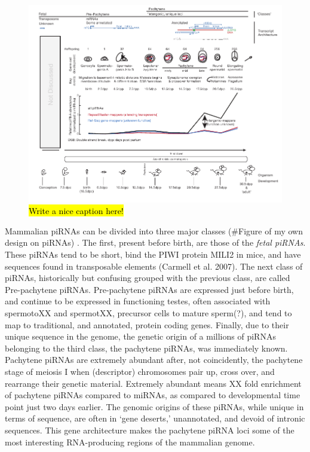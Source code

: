 \begin{figure}[htbp]
	\centering 
	\includegraphics{Figures/MammalianPiRNAClassesOverTime.pdf}
	\caption[Different Classes of mammalian piRNAs]
	{
		\hl{Write a nice caption here!}
	}
	\label{fig:Mammalian piRNA classes}
\end{figure}

Mammalian piRNAs can be divided into three major classes (\#Figure of my own design on piRNAs) \citep{Kuramochi-Miyagawa2008}. The first, present before birth, are those of the \textit{fetal piRNAs}. These piRNAs tend to be short, bind the PIWI protein MILI2 in mice, and have sequences found in transposable elements (Carmell et al. 2007). The next class of piRNAs, historically but confusing grouped with the previous class, are called Pre-pachytene piRNAs. Pre-pachytene piRNAs are expressed just before birth, and continue to be expressed in functioning testes, often associated with spermotoXX and spermotXX, precursor cells to mature sperm(?), and tend to map to traditional, and annotated, protein coding genes. Finally, due to their unique sequence in the genome, the genetic origin of a millions of piRNAs belonging to the third class, the pachytene piRNAs, was immediately known. Pachytene piRNAs are extremely abundant after, not coincidently, the pachytene stage of meiosis I when (descriptor) chromosomes pair up, cross over, and rearrange their genetic material. Extremely abundant means XX fold enrichment of pachytene piRNAs compared to miRNAs, as compared to developmental time point just two days earlier. The genomic origins of these piRNAs, while unique in terms of sequence, are often in ‘gene deserts,’ unannotated, and devoid of intronic sequences. This gene architecture makes the pachytene piRNA loci some of the most interesting RNA-producing regions of the mammalian genome.
 
